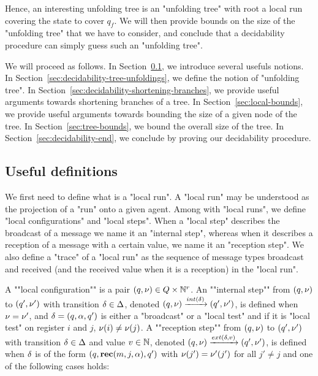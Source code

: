 Hence, an interesting unfolding tree is an "unfolding tree" with root a local run covering the state to cover $q_f$.
We will then provide bounds on the size of the "unfolding tree" that we have to consider, and conclude that a decidability procedure can simply guess such an "unfolding tree". 

We will proceed as follows. In Section~\ref{sec:decidability-defs}, we introduce several usefuls notions. In Section~\ref{sec:decidability-tree-unfoldings}, we define the notion of "unfolding tree". In Section~\ref{sec:decidability-shortening-branches}, we provide useful arguments towards shortening branches of a tree. In Section~\ref{sec:local-bounds}, we provide useful arguments towards bounding the size of a given node of the tree. In Section~\ref{sec:tree-bounds}, we bound the overall size of the tree. In Section~\ref{sec:decidability-end}, we conclude by proving our decidability procedure. 


\subsection{Useful definitions}
\label{sec:decidability-defs}

We first need to define what is a "local run". A "local run" may be understood as the projection of a "run" onto a given agent. Among with "local runs", we define "local configurations" and "local steps".  When a "local step" describes the broadcast of a message we name it an "internal step", whereas when it describes a reception of a message with a certain value, we name it an "reception step". We also define a "trace" of a "local run" as the sequence of message types broadcast and received (and the received value when it is a reception) in the "local run".
	
\AP A ""local configuration"" is a pair $(q, \nu) \in Q \times \mathbb{N}^r$.  
\AP An ""internal step"" from $(q,\nu)$ to $(q',\nu')$ with transition $\delta \in \Delta$, denoted $(q,\localdata) \intstep{\atrans} (q',\localdata')$, is defined when $\nu = \nu'$, and $\delta =(q, \alpha, q')$ is either a "broadcast" or a "local test" and if it is "local test" on register $i$ and $j$, $\nu(i) \ne \nu(j)$.  
\AP A ""reception step"" from $(q,\nu)$ to $(q',\nu')$ with transition $\delta \in \Delta$ and value $v \in \mathbb{N}$, denoted $(q,\localdata) \extbr{\atrans}{\aval} (q',\localdata')$, is defined when $\delta$ is of the form $(q,\textbf{rec}(m, j, \alpha),q')$ with $\nu(j') = \nu'(j')$ for all $j' \neq j$ and one of the following cases holds:
	
